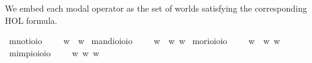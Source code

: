 \begin{isabellebody}
%
\begin{isamarkuptext}%
We embed each modal operator as the set of worlds satisfying the corresponding HOL formula.%
\end{isamarkuptext}\isamarkuptrue%
\isamarkupfalse%
\ mnot{\isacharcolon}{\isacharcolon}{\isachardoublequoteopen}io{\isasymRightarrow}io{\isachardoublequoteclose}\ {\isacharparenleft}{\isachardoublequoteopen}\ \ {\isachardoublequoteopen}\isactrlbold {\isasymnot}{\isasymphi}\ {\isasymequiv}\ {\isasymlambda}w{\isachardot}\ {\isasymnot}{\isacharparenleft}{\isasymphi}\ w{\isacharparenright}{\isachardoublequoteclose}\isanewline
{}\isamarkupfalse%
\ mand{\isacharcolon}{\isacharcolon}{\isachardoublequoteopen}io{\isasymRightarrow}io{\isasymRightarrow}io{\isachardoublequoteclose}\ {\isacharparenleft}\ \ {\isachardoublequoteopen}{\isasymphi}\isactrlbold {\isasymand}{\isasympsi}\ {\isasymequiv}\ {\isasymlambda}w{\isachardot}\ {\isacharparenleft}{\isasymphi}\ w{\isacharparenright}{\isasymand}{\isacharparenleft}{\isasympsi}\ w{\isacharparenright}{\isachardoublequoteclose}\isanewline
{}\isamarkupfalse%
\ mor{\isacharcolon}{\isacharcolon}{\isachardoublequoteopen}io{\isasymRightarrow}io{\isasymRightarrow}io{\isachardoublequoteclose}\ {\isacharparenleft}\ \ {\isachardoublequoteopen}{\isasymphi}\isactrlbold {\isasymor}{\isasympsi}\ {\isasymequiv}\ {\isasymlambda}w{\isachardot}\ {\isacharparenleft}{\isasymphi}\ w{\isacharparenright}{\isasymor}{\isacharparenleft}{\isasympsi}\ w{\isacharparenright}{\isachardoublequoteclose}\isanewline
{}\isamarkupfalse%
\ mimp{\isacharcolon}{\isacharcolon}{\isachardoublequoteopen}io{\isasymRightarrow}io{\isasymRightarrow}io{\isachardoublequoteclose}\ {\isacharparenleft}\ \ {\isachardoublequoteopen}{\isasymphi}\isactrlbold {\isasymrightarrow}{\isasympsi}\ {\isasymequiv}\ {\isasymlambda}w{\isachardot}{\isacharparenleft}{\isasymphi}\ w{\isacharparenright}{\isasymlongrightarrow}{\isacharparenleft}{\isasympsi}\ w{\isacharparenright}{\isachardoublequoteclose}%

\end{isabellebody}
